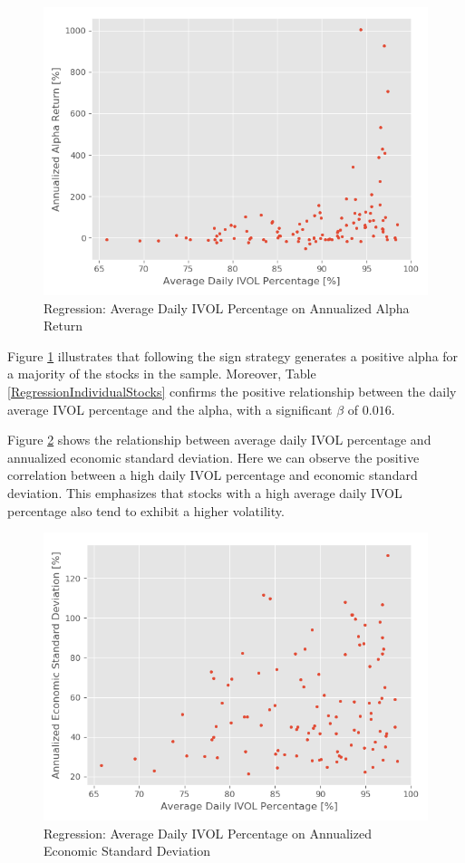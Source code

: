 \begin{figure}[h]
    \centering
    \includegraphics[scale = 0.5]{Plot/IndividualStockRegression2.png}
    \caption{Regression: Average Daily IVOL Percentage on Annualized Alpha Return}
    \label{IVAlphaRegression}
\end{figure}

Figure \ref{IVAlphaRegression} illustrates that following the sign strategy generates a positive alpha for a majority of the stocks in the sample. Moreover, Table \ref{RegressionIndividualStocks} confirms the positive relationship between the daily average IVOL percentage and the alpha, with a significant $\beta$ of $0.016$. 

Figure \ref{IVtoVol} shows the relationship between average daily IVOL percentage and annualized economic standard deviation. Here we can observe the positive correlation between a high daily IVOL percentage and economic standard deviation. This emphasizes that stocks with a high average daily IVOL percentage also tend to exhibit a higher volatility.  

\begin{figure}[h]
    \centering
    \includegraphics[scale = 0.5]{Plot/IVvsEconomicVolatilityRegression.png}
    \caption{Regression: Average Daily IVOL Percentage on Annualized Economic Standard Deviation}
    \label{IVtoVol}
\end{figure}

